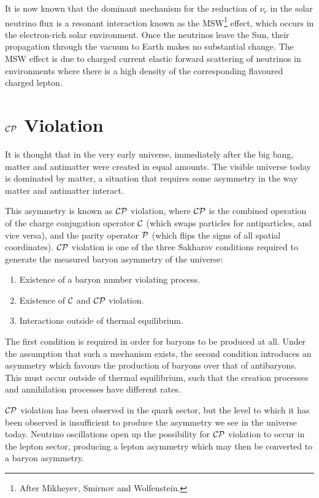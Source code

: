 It is now known that the dominant mechanism for the reduction of $\nu_e$ in the solar neutrino flux is a resonant interaction known as the MSW\footnote{After Mikheyev, Smirnov and Wolfenstein.} effect, which occurs in the electron-rich solar environment. Once the neutrinos leave the Sun, their propagation through the vacuum to Earth makes no substantial change. The MSW effect is due to charged current elastic forward scattering of neutrinos in environments where there is a high density of the corresponding flavoured charged lepton\citep{Zuber2004}.

\section{$\mathcal{C}\mathcal{P}$ Violation}
It is thought that in the very early universe, immediately after the big bang, matter and antimatter were created in equal amounts. The visible universe today is dominated by matter, a situation that requires some asymmetry in the way matter and antimatter interact\citep{Perkins2000}.

This asymmetry is known as $\mathcal{C}\mathcal{P}$ violation, where $\mathcal{C}\mathcal{P}$ is the combined operation of the charge conjugation operator $\mathcal{C}$ (which swaps particles for antiparticles, and vice versa), and the parity operator $\mathcal{P}$ (which flips the signs of all spatial coordinates). $\mathcal{C}\mathcal{P}$ violation is one of the three Sakharov conditions\citep{Sakharov1967} required to generate the measured baryon asymmetry of the universe:
\begin{enumerate}
    \item Existence of a baryon number violating process.
    \item Existence of $\mathcal{C}$ and $\mathcal{C}\mathcal{P}$ violation.
    \item Interactions outside of thermal equilibrium.
\end{enumerate}

The first condition is required in order for baryons to be produced at all. Under the assumption that such a mechanism exists, the second condition introduces an asymmetry which favours the production of baryons over that of antibaryons. This must occur outside of thermal equilibrium, such that the creation processes and annihilation processes have different rates.

$\mathcal{C}\mathcal{P}$ violation has been observed in the quark sector\citep{PDG2012}, but the level to which it has been observed is insufficient to produce the asymmetry we see in the universe today. Neutrino oscillations open up the possibility for $\mathcal{C}\mathcal{P}$ violation to occur in the lepton sector, producing a lepton asymmetry which may then be converted to a baryon asymmetry\citep{Riotto1999}.

